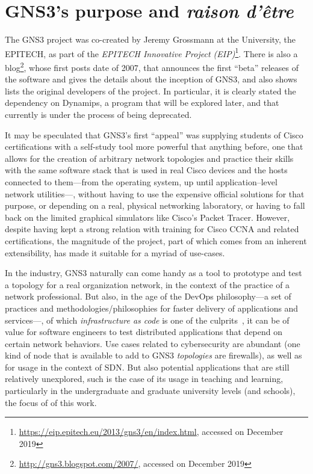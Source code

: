 
\section{GNS3's purpose and \emph{raison d'être}}
\label{sec:gns3why}

The GNS3 project was co-created by Jeremy Grossmann at the University, the EPITECH, as part of the \emph{EPITECH Innovative Project (EIP)}\footnote{\url{https://eip.epitech.eu/2013/gns3/en/index.html}, accessed on December 2019}.
There is also a blog\footnote{\url{http://gns3.blogspot.com/2007/}, accessed on December 2019}, whose first posts date of 2007, that announces the first ``beta'' releases of the software and gives the details about the inception of GNS3, and also shows lists the original developers of the project. In particular, it is clearly stated the dependency on Dynamips, a program that will be explored later, and that currently is under the process of being deprecated.

It may be speculated that GNS3's first ``appeal'' was supplying students of Cisco certifications with a self-study tool more powerful that anything before, one that allows for the creation of arbitrary network topologies and practice their skills with the same software stack that is used in real Cisco devices and the hosts connected to them---from the operating system, up until application--level network utilities---, without having to use the expensive official solutions for that purpose, or depending on a real, physical networking laboratory, or having to fall back on the limited graphical simulators like Cisco's Packet Tracer.
However, despite having kept a strong relation with training for Cisco CCNA and related certifications, the magnitude of the project, part of which comes from an inherent extensibility, has made it suitable for a myriad of use-cases.

In the industry, GNS3 naturally can come handy as a tool to prototype and test a topology for a real organization network, in the context of the practice of a network professional. But also, in the age of the DevOps philosophy---a set of practices and methodologies/philosophies for faster delivery of applications and services---, of which \emph{infrastructure as code} is one of the culprits~\cite{awswhatisdevops}, it can be of value for software engineers to test distributed applications that depend on certain network behaviors. Use cases related to cybersecurity are abundant (one kind of node that is available to add to GNS3 \emph{topologies} are firewalls), as well as for usage in the context of \gls{SDN}.
But also potential applications that are still relatively unexplored, such is the case of its usage in teaching and learning, particularly in the undergraduate and graduate university levels (and schools), the focus of of this work.

